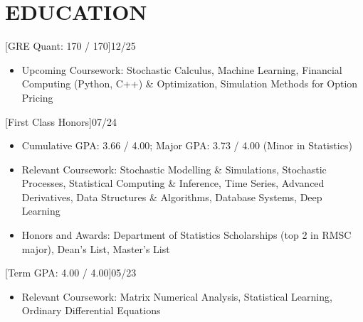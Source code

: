 \documentclass[cmu]{resume}
\begin{document}
    \address{160 Water Street, New York, NY 10038}
    \maketitle
    \section{EDUCATION}
    [GRE Quant: 170 / 170]{12/25}
    \begin{itemize}
        \item Upcoming Coursework: Stochastic Calculus, Machine Learning, Financial Computing (Python, C++) \& Optimization, Simulation Methods for Option Pricing
    \end{itemize}

    [First Class Honors]{07/24}
    \begin{itemize}
        \item Cumulative GPA: 3.66 / 4.00; Major GPA: 3.73 / 4.00 (Minor in Statistics)
        \item Relevant Coursework: Stochastic Modelling \& Simulations, Stochastic Processes, Statistical Computing \& Inference, Time Series, Advanced Derivatives, Data Structures \& Algorithms, Database Systems, Deep Learning
        \item Honors and Awards: Department of Statistics Scholarships (top 2 in RMSC major), Dean's List, Master's List
    \end{itemize}

    [Term GPA: 4.00 / 4.00]{05/23}
    \begin{itemize}
        \item Relevant Coursework: Matrix Numerical Analysis, Statistical Learning, Ordinary Differential Equations
    \end{itemize}
\end{document}
